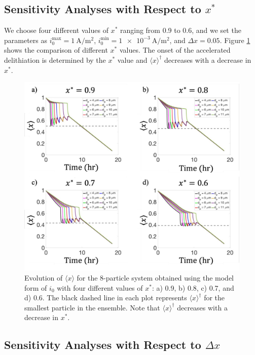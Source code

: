\documentclass{article}
\begin{document}
\subsection{Sensitivity Analyses with Respect to $x^{\ast}$}

We choose four different values of $x^{\ast}$ ranging from 0.9 to 0.6,
and we set the parameters as
$i_0^{\mathrm{max}}=\SI{1}{\ampere\per\meter\squared}$,
$i_0^{\mathrm{min}}=\SI{1e-3}{\ampere\per\meter\squared}$, and $\Delta
x=0.05$. Figure \ref{fig:x-star-sensitivity} shows the comparison of
different $x^{\ast }$ values. The onset of the accelerated
delithiation is determined by the $x^\ast$ value and $\langle x
\rangle^\dag$ decreases with a decrease in $x^\ast$.

\begin{figure}
  \centering
  \includegraphics[width=6.5in]{8-particle-evolution-xstar.png}
  \caption{Evolution of $\langle x \rangle$ for the 8-particle system obtained using
    the model form of $i_0$ with four different values of $x^\ast$: a)
    0.9, b) 0.8, c) 0.7, and d) 0.6. The black dashed line in each
    plot represents $\langle x \rangle^\dag$ for the smallest particle in the
    ensemble. Note that $\langle x \rangle^\dag$ decreases with a decrease in
    $x^\ast$.}
  \label{fig:x-star-sensitivity}
\end{figure}

\subsection{Sensitivity Analyses with Respect to $\Delta x$}
\end{document}
